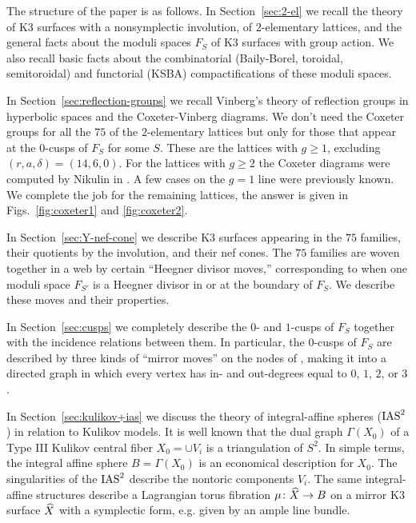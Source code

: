 \documentclass{amsart}
\begin{document}
\medskip

The structure of the paper is as follows.  In Section~\ref{sec:2-el}
we recall the theory of K3 surfaces with a nonsymplectic involution,
of $2$-elementary lattices, and the general facts about the moduli
spaces $F_S$ of K3 surfaces with group action. We
also recall basic facts about the combinatorial (Baily-Borel,
toroidal, semitoroidal) and functorial (KSBA) compactifications of these
moduli spaces.

In Section~\ref{sec:reflection-groups} we recall Vinberg's theory of
reflection groups in hyperbolic spaces and the Coxeter-Vinberg
diagrams. We don't need the Coxeter groups for all the $75$ of the
$2$-elementary lattices but only for those that appear at the
$0$-cusps of $F_S$ for some $S$. These are the lattices with $g\ge1$,
excluding $(r,a,\delta)=(14,6,0)$. For the lattices with $g\ge2$ the Coxeter
diagrams were computed by Nikulin in \cite{alexeev2006del-pezzo}. A
few cases on the $g=1$ line were previously known. We complete the job
for the remaining lattices, the answer is given in
Figs.~\ref{fig:coxeter1} and \ref{fig:coxeter2}.

In Section~\ref{sec:Y-nef-cone} we describe K3 surfaces appearing in
the $75$ families, their quotients by the involution, and their nef
cones. The $75$ families are woven together in a web by certain
``Heegner divisor moves,'' corresponding to when one moduli
space $F_{S'}$ is a Heegner divisor in or at the boundary of $F_S$.
 We describe these moves and their
properties.

In Section~\ref{sec:cusps} we completely describe the $0$- and
$1$-cusps of $F_S$ together with the incidence relations between them.
In particular, the $0$-cusps of $F_S$ are described by three kinds of
``mirror moves'' on the nodes of \fign, making it into a directed graph
in which every vertex has in- and out-degrees equal to $0$, $1$, $2$, or
$3$.

In Section~\ref{sec:kulikov+ias} we discuss the theory of integral-affine
spheres ($\operatorname{IAS}^2$) in relation to Kulikov models.
It is well known that the dual graph $\Gamma(X_0)$ of a Type III
Kulikov central fiber $X_0=\cup V_i$ is a triangulation of $S^2$.
In simple terms, the integral affine sphere $B=\Gamma(X_0)$ is an
economical description for $X_0$. The singularities of the $\operatorname{IAS}^2$
describe the nontoric components $V_i$. The same integral-affine
structures describe a Lagrangian torus fibration $\mu\colon {\widehat X}\to B$ on a
mirror K3 surface ${\widehat X}$ with a symplectic form, e.g. given by an ample
line bundle.
\end{document}
